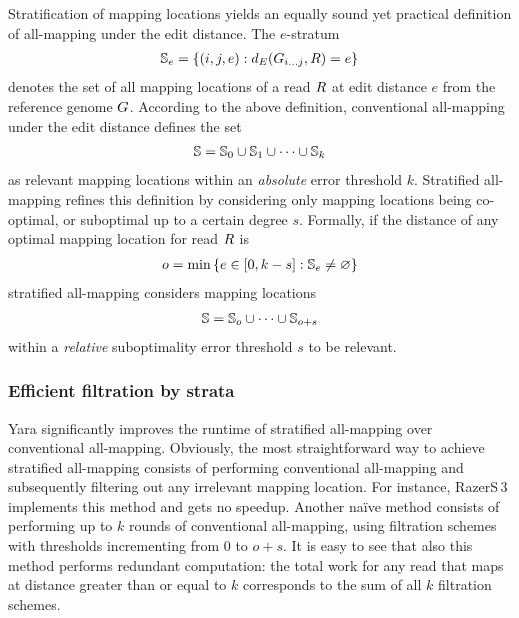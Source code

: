 Stratification of mapping locations yields an equally sound yet practical definition of all-mapping under the edit distance.
The $e$-stratum
\begin{eqnarray}
\mathbb{S}_e = \{ (i,j,e) : d_E({G}_{{i}\dots{j}},R) = e\}
\end{eqnarray}
denotes the set of all mapping locations of a read $R$ at edit distance $e$ from the reference genome $G$.
According to the above definition, conventional all-mapping under the edit distance defines the set
\begin{eqnarray}
\mathbb{S} = \mathbb{S}_0 \cup \mathbb{S}_1 \cup \dots \cup \mathbb{S}_k\label{eq:all-mapping}
\end{eqnarray}
as relevant mapping locations within an \emph{absolute} error threshold $k$.
Stratified all-mapping refines this definition by considering only mapping locations being co-optimal, or suboptimal up to a certain degree $s$.
Formally, if the distance of any optimal mapping location for read $R$ is
\begin{eqnarray}
o = \text{min} \,\{ e \in [0,k-s] : \mathbb{S}_e \neq \varnothing \}
\end{eqnarray}
stratified all-mapping considers mapping locations
\begin{eqnarray}
\mathbb{S} = \mathbb{S}_{o} \cup \dots \cup \mathbb{S}_{o+s}\label{eq:strata-mapping}
\end{eqnarray}
within a \emph{relative} suboptimality error threshold $s$ to be relevant.

\subsubsection{Efficient filtration by strata}

Yara significantly improves the runtime of stratified all-mapping over conventional all-mapping.
Obviously, the most straightforward way to achieve stratified all-mapping consists of performing conventional all-mapping and subsequently filtering out any irrelevant mapping location.
For instance, RazerS\,3 implements this method and gets no speedup.
Another na\"ive method consists of performing up to $k$ rounds of conventional all-mapping, using filtration schemes with thresholds incrementing from $0$ to $o+s$.
It is easy to see that also this method performs redundant computation: the total work for any read that maps at distance greater than or equal to $k$ corresponds to the sum of all $k$ filtration schemes.

